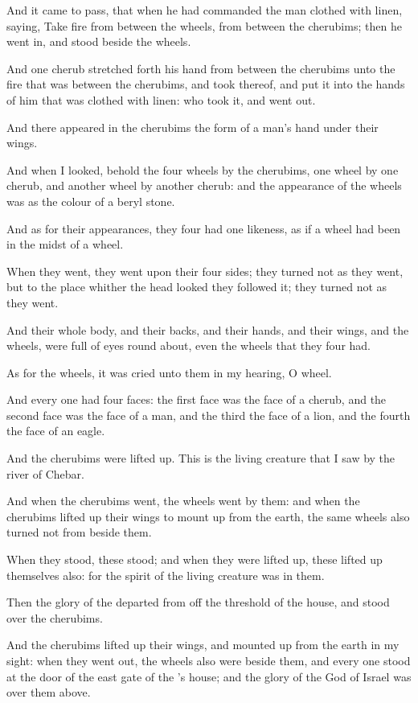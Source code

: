 \verse And it came to pass, that when he had commanded the man clothed with linen, saying, Take fire from between the wheels, from between the cherubims; then he went in, and stood beside the wheels.

\verse And one cherub stretched forth his hand from between the cherubims unto the fire that was between the cherubims, and took thereof, and put it into the hands of him that was clothed with linen: who took it, and went out.

\verse And there appeared in the cherubims the form of a man's hand under their wings.

\verse And when I looked, behold the four wheels by the cherubims, one wheel by one cherub, and another wheel by another cherub: and the appearance of the wheels was as the colour of a beryl stone.

\verse And as for their appearances, they four had one likeness, as if a wheel had been in the midst of a wheel.

\verse When they went, they went upon their four sides; they turned not as they went, but to the place whither the head looked they followed it; they turned not as they went.

\verse And their whole body, and their backs, and their hands, and their wings, and the wheels, were full of eyes round about, even the wheels that they four had.

\verse As for the wheels, it was cried unto them in my hearing, O wheel.

\verse And every one had four faces: the first face was the face of a cherub, and the second face was the face of a man, and the third the face of a lion, and the fourth the face of an eagle.

\verse And the cherubims were lifted up. This is the living creature that I saw by the river of Chebar.

\verse And when the cherubims went, the wheels went by them: and when the cherubims lifted up their wings to mount up from the earth, the same wheels also turned not from beside them.

\verse When they stood, these stood; and when they were lifted up, these lifted up themselves also: for the spirit of the living creature was in them.

\verse Then the glory of the \LORD departed from off the threshold of the house, and stood over the cherubims.

\verse And the cherubims lifted up their wings, and mounted up from the earth in my sight: when they went out, the wheels also were beside them, and every one stood at the door of the east gate of the \LORD's house; and the glory of the God of Israel was over them above.

